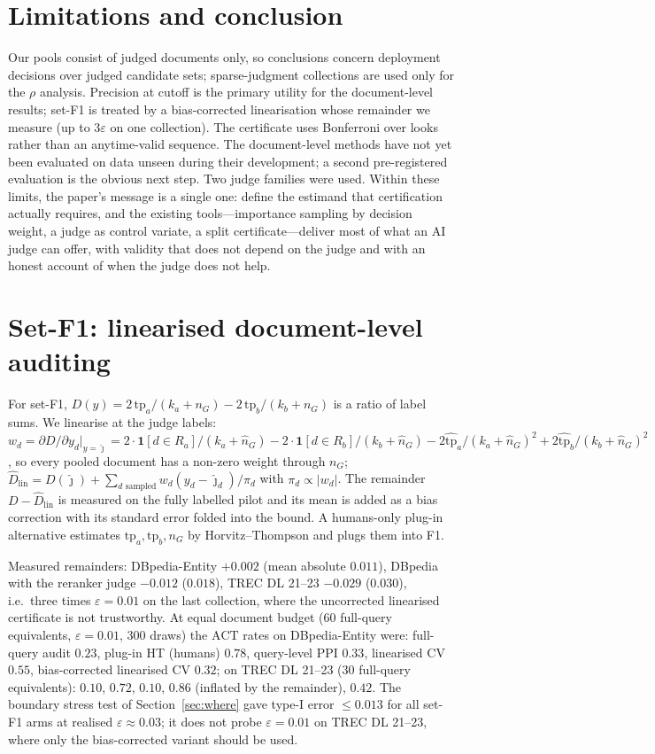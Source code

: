 \documentclass{article}
\newcommand{\eps}{\varepsilon}
\newcommand{\ACT}{\mathrm{ACT}}
\begin{document}
\section{Limitations and conclusion}
Our pools consist of judged documents only, so conclusions concern deployment decisions over judged candidate sets; sparse-judgment collections are used only for the $\rho$ analysis. Precision at cutoff is the primary utility for the document-level results; set-F1 is treated by a bias-corrected linearisation whose remainder we measure (up to $3\eps$ on one collection). The certificate uses Bonferroni over looks rather than an anytime-valid sequence. The document-level methods have not yet been evaluated on data unseen during their development; a second pre-registered evaluation is the obvious next step. Two judge families were used. Within these limits, the paper's message is a single one: define the estimand that certification actually requires, and the existing tools---importance sampling by decision weight, a judge as control variate, a split certificate---deliver most of what an AI judge can offer, with validity that does not depend on the judge and with an honest account of when the judge does not help.




\appendix
\section{Set-F1: linearised document-level auditing}\label{app:f1}
For set-F1, $D(y)=2\,\mathrm{tp}_a/(k_a+n_G)-2\,\mathrm{tp}_b/(k_b+n_G)$ is a ratio of label sums. We linearise at the judge labels: $w_d=\partial D/\partial y_d|_{y=\hat\jmath}=2\cdot\mathbf 1[d\in R_a]/(k_a+\hat n_G)-2\cdot\mathbf 1[d\in R_b]/(k_b+\hat n_G)-2\hat{\mathrm{tp}}_a/(k_a+\hat n_G)^2+2\hat{\mathrm{tp}}_b/(k_b+\hat n_G)^2$, so every pooled document has a non-zero weight through $n_G$; $\hat D_{\mathrm{lin}}=D(\hat\jmath)+\sum_{d\text{ sampled}}w_d(y_d-\hat\jmath_d)/\pi_d$ with $\pi_d\propto|w_d|$. The remainder $D-\hat D_{\mathrm{lin}}$ is measured on the fully labelled pilot and its mean is added as a bias correction with its standard error folded into the bound. A humans-only plug-in alternative estimates $\mathrm{tp}_a,\mathrm{tp}_b,n_G$ by Horvitz--Thompson and plugs them into F1.

Measured remainders: DBpedia-Entity $+0.002$ (mean absolute $0.011$), DBpedia with the reranker judge $-0.012$ ($0.018$), TREC DL 21--23 $-0.029$ ($0.030$), i.e.\ three times $\eps=0.01$ on the last collection, where the uncorrected linearised certificate is not trustworthy. At equal document budget (60 full-query equivalents, $\eps=0.01$, 300 draws) the $\ACT$ rates on DBpedia-Entity were: full-query audit $0.23$, plug-in HT (humans) $0.78$, query-level PPI $0.33$, linearised CV $0.55$, bias-corrected linearised CV $0.32$; on TREC DL 21--23 (30 full-query equivalents): $0.10$, $0.72$, $0.10$, $0.86$ (inflated by the remainder), $0.42$. The boundary stress test of Section~\ref{sec:where} gave type-I error $\le0.013$ for all set-F1 arms at realised $\eps\approx0.03$; it does not probe $\eps=0.01$ on TREC DL 21--23, where only the bias-corrected variant should be used.
\end{document}
